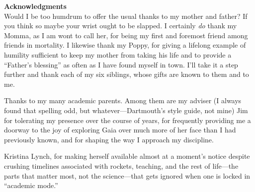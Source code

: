 
{\Huge \bf Acknowledgments} \\

Would I be too humdrum to offer the usual thanks to my mother and father? If you
think so maybe your wrist ought to be slapped. I certainly \emph{do} thank my
Momma, as I am wont to call her, for being my first and foremost friend among
friends in mortality. I likewise thank my Poppy, for giving a lifelong example
of humility sufficient to keep my mother from taking his life and to provide a
``Father's blessing'' as often as I have found myself in town. I'll take it a
step further and thank each of my six siblings, whose gifts are known to them
and to me.

Thanks to my many academic parents. Among them are my adviser (I always found
that spelling odd, but whatever---Dartmouth's style guide, not mine) Jim for
tolerating my presence over the course of years, for frequently providing me a
doorway to the joy of exploring Gaia over much more of her face than I had
previously known, and for shaping the way I approach my discipline.

Kristina Lynch, for making herself available almost at a moment's notice despite
crushing timelines associated with rockets, teaching, and the rest of life---the
parts that matter most, not the science---that gets ignored when one is locked
in ``academic mode.''

